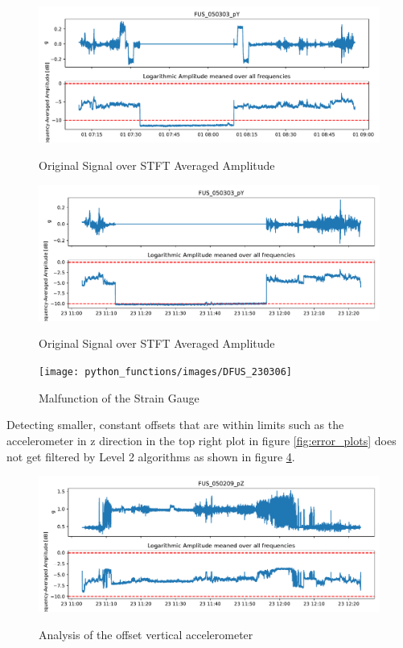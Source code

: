 \begin{figure}
    \centering
    \includegraphics[width=\textwidth]{03_figures/python_functions/images/FUS_050303}
    \label{fig:results_050303_1}
    \caption{Original Signal over STFT Averaged Amplitude}
\end{figure}
\begin{figure}
    \centering
    \includegraphics[width=\textwidth]{03_figures/python_functions/images/FUS_050303_2}
    \label{fig:results_050303_2}
    \caption{Original Signal over STFT Averaged Amplitude}
\end{figure}
\begin{figure}
    \centering
    \texttt{[image: python\_functions/images/DFUS\_230306]}
    \caption{Malfunction of the Strain Gauge}
    \label{fig:results_230306}
\end{figure}

Detecting smaller, constant offsets that are within limits such as the accelerometer in z direction in the top right plot in figure \ref{fig:error_plots} does not get filtered by Level 2 algorithms as shown in figure \ref{fig:results_050209}.
\begin{figure}
    \centering
    \includegraphics[width=\textwidth]{03_figures/python_functions/images/FUS_050209}
    \label{fig:results_050209}
    \caption{Analysis of the offset vertical accelerometer}
\end{figure}

